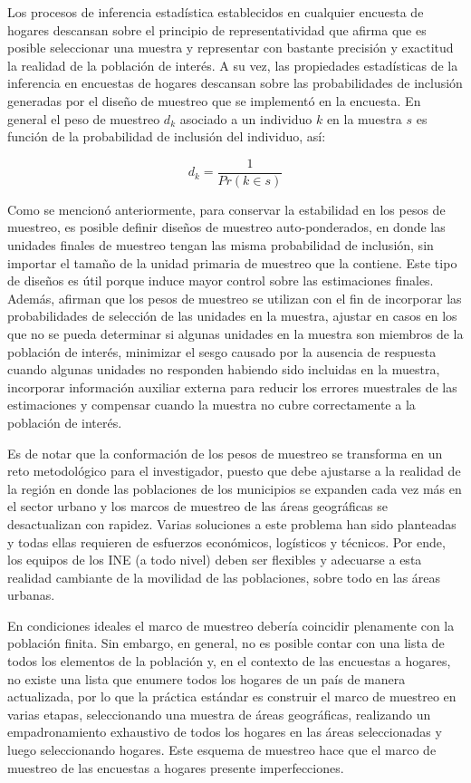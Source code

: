 \documentclass[
  12pt,
  spanish,
]{book}
\begin{document}
Los procesos de inferencia estadística establecidos en cualquier encuesta de hogares descansan sobre el principio de representatividad que afirma que es posible seleccionar una muestra y representar con bastante precisión y exactitud la realidad de la población de interés. A su vez, las propiedades estadísticas de la inferencia en encuestas de hogares descansan sobre las probabilidades de inclusión generadas por el diseño de muestreo que se implementó en la encuesta. En general el peso de muestreo \(d_k\) asociado a un individuo \(k\) en la muestra \(s\) es función de la probabilidad de inclusión del individuo, así:

\[
d_k = \frac{1}{Pr(k\in s)}
\]

Como se mencionó anteriormente, para conservar la estabilidad en los pesos de muestreo, es posible definir diseños de muestreo auto-ponderados, en donde las unidades finales de muestreo tengan las misma probabilidad de inclusión, sin importar el tamaño de la unidad primaria de muestreo que la contiene. Este tipo de diseños es útil porque induce mayor control sobre las estimaciones finales. Además, \citet{Valliant_Dever_2017} afirman que los pesos de muestreo se utilizan con el fin de incorporar las probabilidades de selección de las unidades en la muestra, ajustar en casos en los que no se pueda determinar si algunas unidades en la muestra son miembros de la población de interés, minimizar el sesgo causado por la ausencia de respuesta cuando algunas unidades no responden habiendo sido incluidas en la muestra, incorporar información auxiliar externa para reducir los errores muestrales de las estimaciones y compensar cuando la muestra no cubre correctamente a la población de interés.

Es de notar que la conformación de los pesos de muestreo se transforma en un reto metodológico para el investigador, puesto que debe ajustarse a la realidad de la región en donde las poblaciones de los municipios se expanden cada vez más en el sector urbano y los marcos de muestreo de las áreas geográficas se desactualizan con rapidez. Varias soluciones a este problema han sido planteadas \citep{Gambino_Silva_2009} y todas ellas requieren de esfuerzos económicos, logísticos y técnicos. Por ende, los equipos de los INE (a todo nivel) deben ser flexibles y adecuarse a esta realidad cambiante de la movilidad de las poblaciones, sobre todo en las áreas urbanas.

En condiciones ideales el marco de muestreo debería coincidir plenamente con la población finita. Sin embargo, en general, no es posible contar con una lista de todos los elementos de la población y, en el contexto de las encuestas a hogares, no existe una lista que enumere todos los hogares de un país de manera actualizada, por lo que la práctica estándar es construir el marco de muestreo en varias etapas, seleccionando una muestra de áreas geográficas, realizando un empadronamiento exhaustivo de todos los hogares en las áreas seleccionadas y luego seleccionando hogares. Este esquema de muestreo hace que el marco de muestreo de las encuestas a hogares presente imperfecciones.
\end{document}
